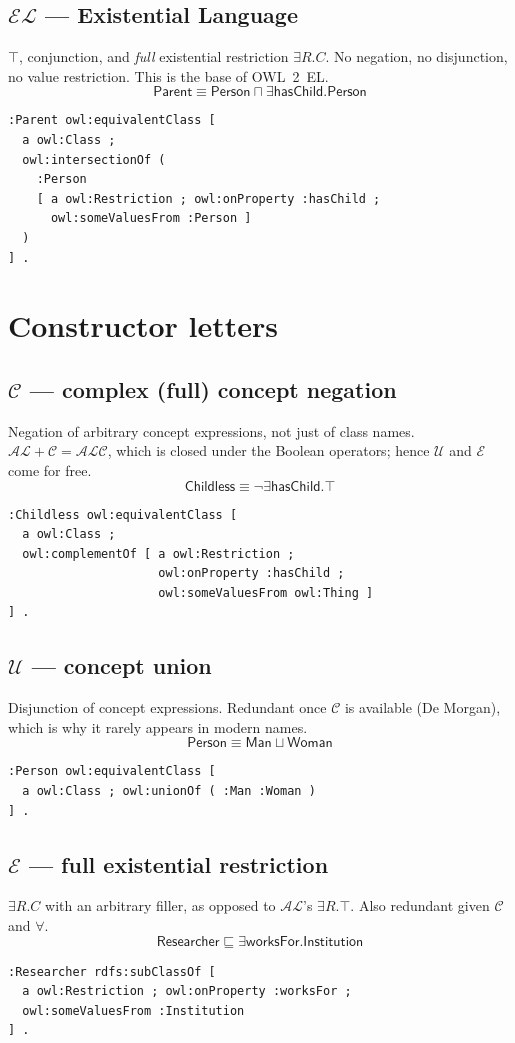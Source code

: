 \documentclass[11pt,a4paper]{article}
\newcommand{\dl}[1]{\ensuremath{\mathcal{#1}}}
\newcommand{\ALC}{\dl{ALC}}
\newcommand{\EL}{\dl{EL}}
\newcommand{\AL}{\dl{AL}}
\newcommand{\cn}[1]{\mathsf{#1}}      %
\newcommand{\rn}[1]{\mathsf{#1}}      %
\newcommand{\sub}{\sqsubseteq}
\newcommand{\eqv}{\equiv}
\newcommand{\dlaxiom}[1]{%
  \begin{displaymath}#1\end{displaymath}}
\begin{document}
\subsection*{\EL{} --- Existential Language}
$\top$, conjunction, and \emph{full} existential restriction $\exists R.C$.
No negation, no disjunction, no value restriction. This is the base of OWL~2~EL.
\dlaxiom{\cn{Parent} \eqv \cn{Person} \sqcap \exists \rn{hasChild}.\cn{Person}}
\begin{lstlisting}
:Parent owl:equivalentClass [
  a owl:Class ;
  owl:intersectionOf (
    :Person
    [ a owl:Restriction ; owl:onProperty :hasChild ;
      owl:someValuesFrom :Person ]
  )
] .
\end{lstlisting}

\section{Constructor letters}

\subsection*{\dl{C} --- complex (full) concept negation}
Negation of arbitrary concept expressions, not just of class names.
$\AL + \dl{C} = \ALC$, which is closed under the Boolean operators; hence
\dl{U} and \dl{E} come for free.
\dlaxiom{\cn{Childless} \eqv \neg \exists \rn{hasChild}.\top}
\begin{lstlisting}
:Childless owl:equivalentClass [
  a owl:Class ;
  owl:complementOf [ a owl:Restriction ;
                     owl:onProperty :hasChild ;
                     owl:someValuesFrom owl:Thing ]
] .
\end{lstlisting}

\subsection*{\dl{U} --- concept union}
Disjunction of concept expressions. Redundant once \dl{C} is available
(De Morgan), which is why it rarely appears in modern names.
\dlaxiom{\cn{Person} \eqv \cn{Man} \sqcup \cn{Woman}}
\begin{lstlisting}
:Person owl:equivalentClass [
  a owl:Class ; owl:unionOf ( :Man :Woman )
] .
\end{lstlisting}

\subsection*{\dl{E} --- full existential restriction}
$\exists R.C$ with an arbitrary filler, as opposed to \AL{}'s
$\exists R.\top$. Also redundant given \dl{C} and $\forall$.
\dlaxiom{\cn{Researcher} \sub \exists \rn{worksFor}.\cn{Institution}}
\begin{lstlisting}
:Researcher rdfs:subClassOf [
  a owl:Restriction ; owl:onProperty :worksFor ;
  owl:someValuesFrom :Institution
] .
\end{lstlisting}
\end{document}
